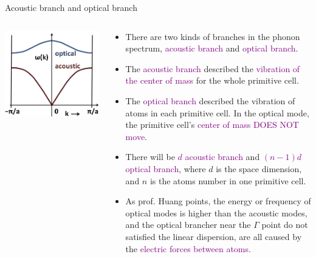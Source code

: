 \documentclass{beamer}
\begin{document}
\begin{frame}{Acoustic branch and optical branch}
\begin{columns}
\begin{column}{0.2\textwidth}
      \includegraphics[width=\textwidth]{figure/ao-opt-phon.png}
    \end{column}
    \begin{column}{0.8\textwidth}
      \begin{block}{}
        \begin{itemize}
          \item There are two kinds of branches in the phonon spectrum, \textcolor{purple}{acoustic branch} and \textcolor{purple}{optical branch}.
          \item The \textcolor{purple}{acoustic branch} described the \textcolor{purple}{vibration of the center of mass} for the whole primitive cell.
          \item The \textcolor{purple}{optical branch} described the vibration of atoms in each primitive cell. In the optical mode, the primitive cell's \textcolor{purple}{center of mass DOES NOT move}.
          \item There will be \textcolor{purple}{\(d\) acoustic branch} and \textcolor{purple}{\((n-1)d\) optical branch}, where \(d\) is the space dimension, and \(n\) is the atoms number in one primitive cell.
          \item As prof. Huang points, the energy or frequency of optical modes is higher than the acoustic modes, and the optical brancher near the \(\Gamma\) point do not satisfied the linear dispersion, are all caused by the \textcolor{purple}{electric forces between atoms}.
        \end{itemize}
      \end{block}
    \end{column}
  \end{columns}
\end{frame}
\end{document}
